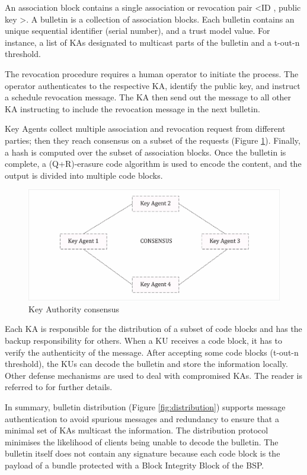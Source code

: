 An association block contains a single association or revocation pair  \textless ID , public key \textgreater. A bulletin is a collection of association blocks. Each bulletin contains an unique sequential identifier (serial number), and a trust model value. For instance, a list of KAs designated to multicast parts of the bulletin and a t-out-n threshold.

The revocation procedure requires a human operator to initiate the process. The operator authenticates to the respective KA, identify the public key, and instruct a schedule revocation message. The KA then send out the message to all other KA instructing to include the revocation message in the next bulletin.   


Key Agents collect multiple association and revocation request from different parties; then they reach consensus on a subset of the requests (Figure \ref{fig:consensus}). Finally, a hash is computed over the subset of association blocks. Once the bulletin is complete, a (Q+R)-erasure code algorithm is used to encode the content, and the output is divided into multiple code blocks. 

\begin{figure}[htb]
\centering
\includegraphics[width=1 \linewidth]{images/consensus.png} 
\caption{Key Authority consensus}
\label{fig:consensus}
\end{figure}


Each KA is responsible for the distribution of a subset of code blocks and has the backup responsibility for others. When a KU receives a code block, it has to verify the authenticity of the message. After accepting some code blocks (t-out-n threshold), the KUs can decode the bulletin and store the information locally. Other defense mechanisms are used to deal with compromised KAs. The reader is referred to \cite{burleigh-dtnwg-dtka-01} for further details.


In summary, bulletin distribution (Figure \ref{fig:distribution}) supports message authentication to avoid spurious messages and redundancy to ensure that a minimal set of KAs multicast the information. The distribution protocol minimises the likelihood of clients being unable to decode the bulletin. The bulletin itself does not contain any signature because each code block is the payload of a bundle protected with a Block Integrity Block of the BSP.

